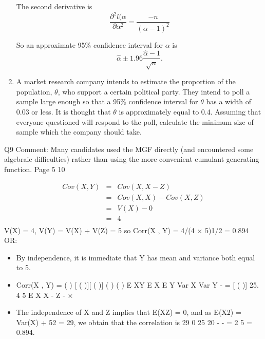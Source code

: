 \documentclass[a4paper,12pt]{article}
\begin{document}
\begin{enumerate}
The second derivative is
\[ \frac{\partial^2 l(\alpha}{ \partial \alpha^2} = \frac{-n}{(\alpha -1)^2} \]

So an approximate 95\% confidence interval for $\alpha$ is 
\[ \hat{\alpha} \pm  1.96 \frac{\hat{\alpha} - 1}{\sqrt{n}} .\]

\newpage
\item A market research company intends to estimate the proportion of the population,
$\theta$, who support a certain political party. They intend to poll a sample large
enough so that a 95\% confidence interval for $\theta$ has a width of 0.03 or less. It is
thought that $\theta$ is approximately equal to 0.4.
Assuming that everyone questioned will respond to the poll, calculate the
minimum size of sample which the company should take. 
\end{enumerate}
Q9 Comment: Many candidates used the MGF directly (and encountered some
algebraic difficulties) rather than using the more convenient cumulant generating
function.
Page 5
10

\begin{eqnarray*}
Cov(X , Y) &=& Cov(X , X - Z) \\ &=& Cov(X , X) - Cov(X , Z) \\ &=& V(X) - 0 \\&=& 4\\
\end{eqnarray*}
V(X) = 4, V(Y) = V(X) + V(Z) = 5
so Corr(X , Y) = 4/(4 × 5)1/2 = 0.894
OR:
\begin{itemize}
    \item By independence, it is immediate that Y has mean and variance both equal
to 5.
\item Corr(X , Y) =
( ) [ ( )][ ( )]
( ) ( )
E XY E X E Y
Var X Var Y
- =
[ ( )] 25.
4 5
E X X - Z -
×
\item The independence of X and Z implies that E(XZ) = 0, and as
E(X2) = Var(X) + 52 = 29, we obtain that the correlation is
29 0 25
20
- - =
2
5
= 0.894.
\end{itemize}
\end{document}
